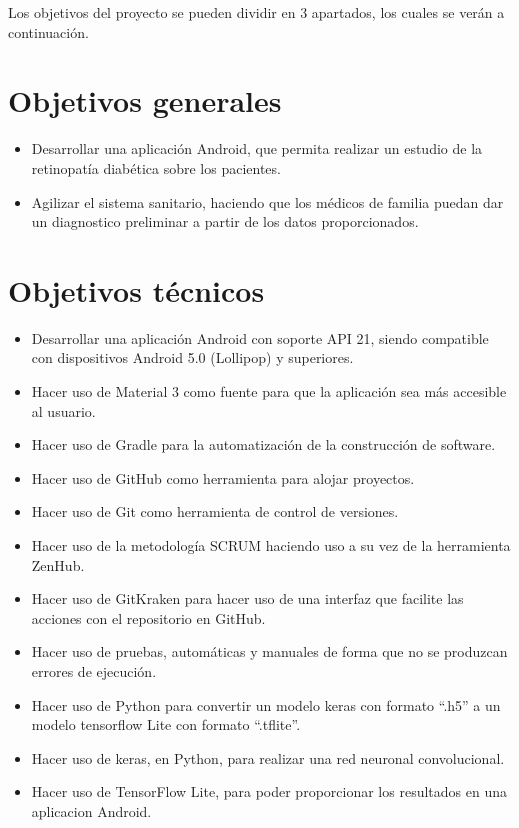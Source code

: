 
Los objetivos del proyecto se pueden dividir en 3 apartados, los cuales se verán a continuación. 
\section{Objetivos generales}
\begin{itemize}
    \item Desarrollar una aplicación Android, que permita realizar un estudio de la retinopatía diabética sobre los pacientes.
    \item Agilizar el sistema sanitario, haciendo que los médicos de familia puedan dar un diagnostico preliminar a partir de los datos proporcionados.

\end{itemize}
\section{Objetivos técnicos}
\begin{itemize}
    \item Desarrollar una aplicación Android con soporte API 21, siendo compatible con dispositivos Android 5.0 (Lollipop) y superiores.
    \item Hacer uso de Material 3 como fuente para que la aplicación sea más accesible al usuario.
    \item Hacer uso de Gradle para la automatización de la construcción de software.
    \item Hacer uso de GitHub como herramienta para alojar proyectos.
    \item Hacer uso de Git como herramienta de control de versiones.
    \item Hacer uso de la metodología SCRUM haciendo uso a su vez de la herramienta ZenHub.
    \item Hacer uso de GitKraken para hacer uso de una interfaz que facilite las acciones con el repositorio en GitHub.
    \item Hacer uso de pruebas, automáticas y manuales de forma que no se produzcan errores de ejecución.
    \item Hacer uso de Python para convertir un modelo keras con formato ``.h5'' a un modelo tensorflow Lite con formato ``.tflite''.
    \item Hacer uso de keras, en Python, para realizar una red neuronal convolucional.
    \item Hacer uso de TensorFlow Lite, para poder proporcionar los resultados en una aplicacion Android.
    
\end{itemize}

